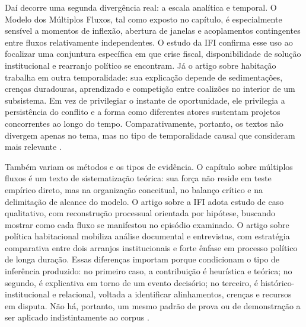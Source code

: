 \documentclass[12pt,a4paper]{article}
\begin{document}
Daí decorre uma segunda divergência real: a escala analítica e temporal. O Modelo dos Múltiplos Fluxos, tal como exposto no capítulo, é especialmente sensível a momentos de inflexão, abertura de janelas e acoplamentos contingentes entre fluxos relativamente independentes. O estudo da IFI confirma esse uso ao focalizar uma conjuntura específica em que crise fiscal, disponibilidade de solução institucional e rearranjo político se encontram. Já o artigo sobre habitação trabalha em outra temporalidade: sua explicação depende de sedimentações, crenças duradouras, aprendizado e competição entre coalizões no interior de um subsistema. Em vez de privilegiar o instante de oportunidade, ele privilegia a persistência do conflito e a forma como diferentes atores sustentam projetos concorrentes ao longo do tempo. Comparativamente, portanto, os textos não divergem apenas no tema, mas no tipo de temporalidade causal que consideram mais relevante \parencite{brasil2022_abordagens_contemporaneas,anonsd_sem_titulo,ferreira2019_politica_habitacional}.

Também variam os métodos e os tipos de evidência. O capítulo sobre múltiplos fluxos é um texto de sistematização teórica: sua força não reside em teste empírico direto, mas na organização conceitual, no balanço crítico e na delimitação de alcance do modelo. O artigo sobre a IFI adota estudo de caso qualitativo, com reconstrução processual orientada por hipótese, buscando mostrar como cada fluxo se manifestou no episódio examinado. O artigo sobre política habitacional mobiliza análise documental e entrevistas, com estratégia comparativa entre dois arranjos institucionais e forte ênfase em processo político de longa duração. Essas diferenças importam porque condicionam o tipo de inferência produzido: no primeiro caso, a contribuição é heurística e teórica; no segundo, é explicativa em torno de um evento decisório; no terceiro, é histórico-institucional e relacional, voltada a identificar alinhamentos, crenças e recursos em disputa. Não há, portanto, um mesmo padrão de prova ou de demonstração a ser aplicado indistintamente ao corpus \parencite{brasil2022_abordagens_contemporaneas,anonsd_sem_titulo,ferreira2019_politica_habitacional}.
\end{document}

